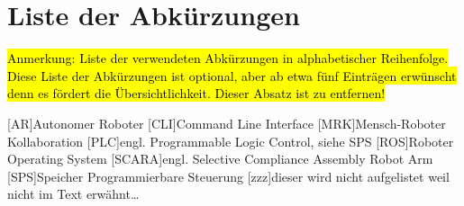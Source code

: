 \section*{Liste der Abkürzungen}

\hl{
  Anmerkung: Liste der verwendeten Abkürzungen in alphabetischer Reihenfolge. Diese
  Liste der Abkürzungen ist optional, aber ab etwa fünf Einträgen erwünscht denn es fördert
  die Übersichtlichkeit. Dieser Absatz ist zu entfernen!
}

\begin{acronym}[SCARA] %
  [AR]{Autonomer Roboter}
  [CLI]{Command Line Interface}
  [MRK]{Mensch-Roboter Kollaboration}
  [PLC]{engl. Programmable Logic Control, siehe SPS}
  [ROS]{Roboter Operating System}
  [SCARA]{engl. Selective Compliance Assembly Robot Arm}
  [SPS]{Speicher Programmierbare Steuerung}
  [zzz]{dieser wird nicht aufgelistet weil nicht im Text erwähnt\dots}
\end{acronym}
